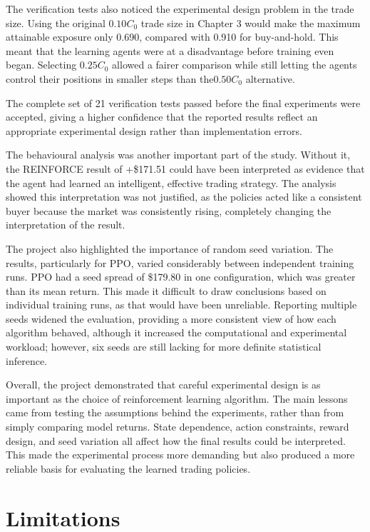 The verification tests also noticed the experimental design problem in
the trade size. Using the original \(0.10C_{0}\) trade size in Chapter 3
would make the maximum attainable exposure only 0.690, compared with
0.910 for buy-and-hold. This meant that the learning agents were at a
disadvantage before training even began. Selecting \(0.25C_{0}\) allowed
a fairer comparison while still letting the agents control their
positions in smaller steps than the\(0.50C_{0}\) alternative.

The complete set of 21 verification tests passed before the final
experiments were accepted, giving a higher confidence that the reported
results reflect an appropriate experimental design rather than
implementation errors.

The behavioural analysis was another important part of the study.
Without it, the REINFORCE result of +\$171.51 could have been
interpreted as evidence that the agent had learned an intelligent,
effective trading strategy. The analysis showed this interpretation was
not justified, as the policies acted like a consistent buyer because the
market was consistently rising, completely changing the interpretation
of the result.

The project also highlighted the importance of random seed variation.
The results, particularly for PPO, varied considerably between
independent training runs. PPO had a seed spread of \$179.80 in one
configuration, which was greater than its mean return. This made it
difficult to draw conclusions based on individual training runs, as that
would have been unreliable. Reporting multiple seeds widened the
evaluation, providing a more consistent view of how each algorithm
behaved, although it increased the computational and experimental
workload; however, six seeds are still lacking for more definite
statistical inference.

Overall, the project demonstrated that careful experimental design is as
important as the choice of reinforcement learning algorithm. The main
lessons came from testing the assumptions behind the experiments, rather
than from simply comparing model returns. State dependence, action
constraints, reward design, and seed variation all affect how the final
results could be interpreted. This made the experimental process more
demanding but also produced a more reliable basis for evaluating the
learned trading policies.

\section{Limitations}


